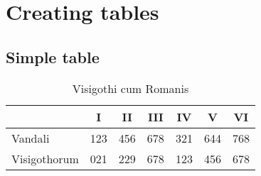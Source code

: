 \documentclass[10pt, letterpaper, twoside]{article}
\begin{document}
\newpage
\section{Creating tables}\label{sec:tables}

\subsection{Simple table}\label{sec:simple_table}

\begin{table}[H]
\begin{flushleft}
\begin{tabular}{lcccccc}
\toprule
             & I   & II  & III & IV  & V   & VI \\
\midrule
Vandali      & 123 & 456 & 678 & 321 & 644 & 768  \\
Visigothorum & 021 & 229 & 678 & 123 & 456 & 678 \\
\bottomrule
\end{tabular}
\label{tab:visigothi_cum_romanis}
\caption{Visigothi cum Romanis}
\end{flushleft}
\end{table}
\end{document}
